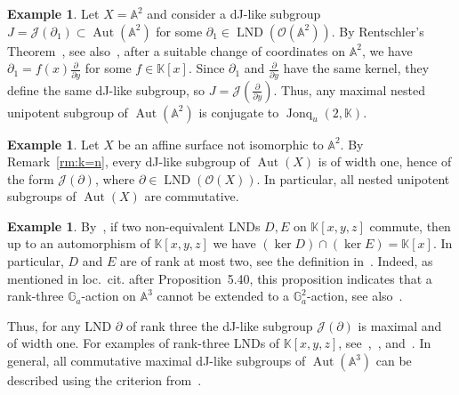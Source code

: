 \documentclass[12pt,a4paper]{amsart}
\theoremstyle{plain}
\theoremstyle{definition}
\newtheorem{example}[theorem]{Example}
\theoremstyle{remark}
\def\Aut{\operatorname{Aut}}
\def\LND{\operatorname{LND}}
\def\AA{{\mathbb A}}
\def\K{{\mathbb K}}
\def\G{{\mathbb G}}
\def\cO{{\mathcal O}}
\def\J{{\mathcal J}}
\DeclareMathOperator{\Jonq}{Jonq}
\begin{document}
   \begin{example}
      Let $X=\AA^2$ and consider a dJ-like subgroup $J=\J(\partial_1)\subset\Aut(\AA^2)$ for some $\partial_1\in\LND(\cO(\AA^2))$. By Rentschler's Theorem~\cite{Ren}, see also~\cite[Theorem 4.1]{Freudenburg}, after a suitable change of coordinates on $\AA^2$, we have $\partial_1=f(x)\frac{\partial}{\partial y}$ for some $f\in\K[x]$.
      Since $\partial_1$ and $\frac{\partial}{\partial y}$ have the same kernel, they define the same dJ-like subgroup, so $J=\J(\frac{\partial}{\partial y})$.
      Thus, any maximal nested unipotent subgroup of $\Aut(\AA^2)$ is conjugate to $\Jonq_u(2,\K)$.
   \end{example}     
        
\begin{example}
   Let $X$ be an affine surface not isomorphic to $\AA^2$.
   By Remark~\ref{rm:k=n}, every  dJ-like subgroup of $\Aut(X)$ is of width one, hence of the form $\J(\partial)$, where $\partial\in\LND(\cO(X))$. 
   In particular, all nested unipotent subgroups of $\Aut(X)$ are commutative.
\end{example}     

\begin{example}
   By~\cite[Proposition 5.40]{Freudenburg}, if two non-equivalent LNDs $D,E$ on $\K[x,y,z]$ commute, then up to an automorphism of $\K[x,y,z]$ we have $(\ker D) \cap (\ker E)=\K[x]$. In particular, $D$ and $E$ are of rank at most two, see the definition in~\cite[Section~3.2.1]{Freudenburg}. Indeed, as mentioned in loc.\ cit. after Proposition~5.40, this proposition indicates that a rank-three $\G_a$-action on $\AA^3$ cannot be extended to a $\G_a^2$-action, see also~\cite{DF}. 
   
   Thus, for any LND $\partial$ of rank three the dJ-like subgroup $\J(\partial)$ is maximal and of width one. For examples of rank-three LNDs of $\K[x,y,z]$, see~\cite{Freu98},~\cite[Chapter~5]{Freudenburg}, and~\cite{DasGa24}.
   In general, all commutative maximal dJ-like subgroups of $\Aut(\AA^3)$ can be described using the criterion from~\cite[Proposition~4.1]{DasGa24}.
\end{example}
\end{document}
